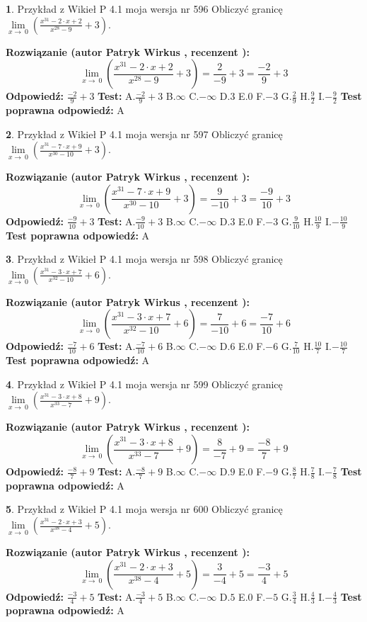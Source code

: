 \documentclass[12pt, a4paper]{article}
\theoremstyle{definition} %
\newtheorem{zad}{}
\newcommand{\zadStart}[1]{\begin{zad}#1\newline}
\newcommand{\zadStop}{\end{zad}}
\newcommand{\rozwStart}[2]{\noindent \textbf{Rozwiązanie (autor #1 , recenzent #2): }\newline}
\newcommand{\rozwStop}{\newline}
\newcommand{\odpStart}{\noindent \textbf{Odpowiedź:}\newline}
\newcommand{\odpStop}{\newline}
\newcommand{\testStart}{\noindent \textbf{Test:}\newline}
\newcommand{\testStop}{\newline}
\newcommand{\kluczStart}{\noindent \textbf{Test poprawna odpowiedź:}\newline}
\newcommand{\kluczStop}{\newline}
\begin{document}
\zadStart{Przykład z Wikieł P 4.1 moja wersja nr 596}
Obliczyć granicę $\lim\limits_{x\to\ 0}(\frac{x^{31}-2 \cdot x +2}{x^{28}-9}+3)$.
\zadStop
\rozwStart{Patryk Wirkus}{}
$$\lim\limits_{x\to\ 0}(\frac{x^{31}-2 \cdot x +2}{x^{28}-9}+3)=\frac{2}{-9}+3=\frac{-2}{9}+3$$
\rozwStop
\odpStart
$\frac{-2}{9}+3$
\odpStop
\testStart
A.$\frac{-2}{9}+3$
B.$\infty$
C.$-\infty$
D.$3$
E.$0$
F.$-3$
G.$\frac{2}{9}$
H.$\frac{9}{2}$
I.$-\frac{9}{2}$
\testStop
\kluczStart
A
\kluczStop



\zadStart{Przykład z Wikieł P 4.1 moja wersja nr 597}
Obliczyć granicę $\lim\limits_{x\to\ 0}(\frac{x^{31}-7 \cdot x +9}{x^{30}-10}+3)$.
\zadStop
\rozwStart{Patryk Wirkus}{}
$$\lim\limits_{x\to\ 0}(\frac{x^{31}-7 \cdot x +9}{x^{30}-10}+3)=\frac{9}{-10}+3=\frac{-9}{10}+3$$
\rozwStop
\odpStart
$\frac{-9}{10}+3$
\odpStop
\testStart
A.$\frac{-9}{10}+3$
B.$\infty$
C.$-\infty$
D.$3$
E.$0$
F.$-3$
G.$\frac{9}{10}$
H.$\frac{10}{9}$
I.$-\frac{10}{9}$
\testStop
\kluczStart
A
\kluczStop



\zadStart{Przykład z Wikieł P 4.1 moja wersja nr 598}
Obliczyć granicę $\lim\limits_{x\to\ 0}(\frac{x^{31}-3 \cdot x +7}{x^{32}-10}+6)$.
\zadStop
\rozwStart{Patryk Wirkus}{}
$$\lim\limits_{x\to\ 0}(\frac{x^{31}-3 \cdot x +7}{x^{32}-10}+6)=\frac{7}{-10}+6=\frac{-7}{10}+6$$
\rozwStop
\odpStart
$\frac{-7}{10}+6$
\odpStop
\testStart
A.$\frac{-7}{10}+6$
B.$\infty$
C.$-\infty$
D.$6$
E.$0$
F.$-6$
G.$\frac{7}{10}$
H.$\frac{10}{7}$
I.$-\frac{10}{7}$
\testStop
\kluczStart
A
\kluczStop



\zadStart{Przykład z Wikieł P 4.1 moja wersja nr 599}
Obliczyć granicę $\lim\limits_{x\to\ 0}(\frac{x^{31}-3 \cdot x +8}{x^{33}-7}+9)$.
\zadStop
\rozwStart{Patryk Wirkus}{}
$$\lim\limits_{x\to\ 0}(\frac{x^{31}-3 \cdot x +8}{x^{33}-7}+9)=\frac{8}{-7}+9=\frac{-8}{7}+9$$
\rozwStop
\odpStart
$\frac{-8}{7}+9$
\odpStop
\testStart
A.$\frac{-8}{7}+9$
B.$\infty$
C.$-\infty$
D.$9$
E.$0$
F.$-9$
G.$\frac{8}{7}$
H.$\frac{7}{8}$
I.$-\frac{7}{8}$
\testStop
\kluczStart
A
\kluczStop



\zadStart{Przykład z Wikieł P 4.1 moja wersja nr 600}
Obliczyć granicę $\lim\limits_{x\to\ 0}(\frac{x^{31}-2 \cdot x +3}{x^{38}-4}+5)$.
\zadStop
\rozwStart{Patryk Wirkus}{}
$$\lim\limits_{x\to\ 0}(\frac{x^{31}-2 \cdot x +3}{x^{38}-4}+5)=\frac{3}{-4}+5=\frac{-3}{4}+5$$
\rozwStop
\odpStart
$\frac{-3}{4}+5$
\odpStop
\testStart
A.$\frac{-3}{4}+5$
B.$\infty$
C.$-\infty$
D.$5$
E.$0$
F.$-5$
G.$\frac{3}{4}$
H.$\frac{4}{3}$
I.$-\frac{4}{3}$
\testStop
\kluczStart
A
\kluczStop
\end{document}
